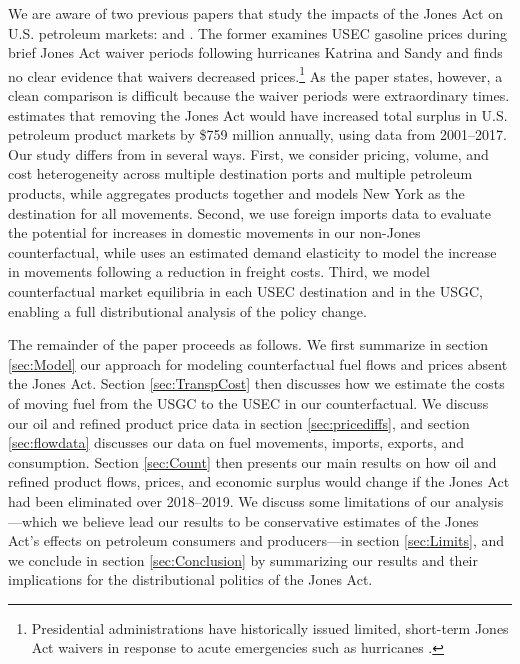 \documentclass[12pt]{article}
\begin{document}
We are aware of two previous papers that study the impacts of the Jones Act on U.S. petroleum markets: \cite{gius2013} and \cite{hernandezetal_2019}. The former examines USEC gasoline prices during brief Jones Act waiver periods following hurricanes Katrina and Sandy and finds no clear evidence that waivers decreased prices.\footnote{Presidential administrations have historically issued limited, short-term Jones Act waivers in response to acute emergencies such as hurricanes \citep{bloomberg2017,politico2022}.} As the paper states, however, a clean comparison is difficult because the waiver periods were extraordinary times. \cite{hernandezetal_2019} estimates that removing the Jones Act would have increased total surplus in U.S. petroleum product markets by \$759 million annually, using data from 2001--2017. Our study differs from \cite{hernandezetal_2019} in several ways. First, we consider pricing, volume, and cost heterogeneity across multiple destination ports and multiple petroleum products, while \cite{hernandezetal_2019} aggregates products together and models New York as the destination for all movements. Second, we use foreign imports data to evaluate the potential for increases in domestic movements in our non-Jones counterfactual, while \cite{hernandezetal_2019} uses an estimated demand elasticity to model the increase in movements following a reduction in freight costs. Third, we model counterfactual market equilibria in each USEC destination and in the USGC, enabling a full distributional analysis of the policy change.

The remainder of the paper proceeds as follows. We first summarize in section \ref{sec:Model} our approach for modeling counterfactual fuel flows and prices absent the Jones Act. Section \ref{sec:TranspCost} then discusses how we estimate the costs of moving fuel from the USGC to the USEC in our counterfactual. We discuss our oil and refined product price data in section \ref{sec:pricediffs}, and section \ref{sec:flowdata} discusses our data on fuel movements, imports, exports, and consumption. Section \ref{sec:Count} then presents our main results on how oil and refined product flows, prices, and economic surplus would change if the Jones Act had been eliminated over 2018--2019. We discuss some limitations of our analysis---which we believe lead our results to be conservative estimates of the Jones Act's effects on petroleum consumers and producers---in section \ref{sec:Limits}, and we conclude in section \ref{sec:Conclusion} by summarizing our results and their implications for the distributional politics of the Jones Act.
\end{document}
